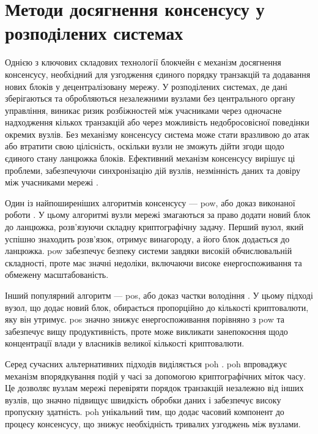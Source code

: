 \documentclass[14pt]{extreport}
\begin{document}
  \section{Методи досягнення консенсусу у розподілених системах}

  Однією з ключових складових технології блокчейн є механізм досягнення консенсусу, необхідний для узгодження єдиного порядку транзакцій та додавання нових блоків у децентралізовану мережу. У розподілених системах, де дані зберігаються та обробляються незалежними вузлами без центрального органу управління, виникає ризик розбіжностей між учасниками через одночасне надходження кількох транзакцій або через можливість недобросовісної поведінки окремих вузлів. Без механізму консенсусу система може стати вразливою до атак або втратити свою цілісність, оскільки вузли не зможуть дійти згоди щодо єдиного стану ланцюжка блоків. Ефективний механізм консенсусу вирішує ці проблеми, забезпечуючи синхронізацію дій вузлів, незмінність даних та довіру між учасниками мережі \cite{consensus}.

  Один із найпоширеніших алгоритмів консенсусу — \gls{pow}, або доказ виконаної роботи \cite{pow}. У цьому алгоритмі вузли мережі змагаються за право додати новий блок до ланцюжка, розв'язуючи складну криптографічну задачу. Перший вузол, який успішно знаходить розв'язок, отримує винагороду, а його блок додається до ланцюжка. \gls{pow} забезпечує безпеку системи завдяки високій обчислювальній складності, проте має значні недоліки, включаючи високе енергоспоживання та обмежену масштабованість.

  Інший популярний алгоритм — \gls{pos}, або доказ частки володіння \cite{pos}. У цьому підході вузол, що додає новий блок, обирається пропорційно до кількості криптовалюти, яку він утримує. \gls{pos} значно знижує енергоспоживання порівняно з \gls{pow} та забезпечує вищу продуктивність, проте може викликати занепокоєння щодо концентрації влади у власників великої кількості криптовалюти.

  Серед сучасних альтернативних підходів виділяється \gls{poh} \cite{poh}. \gls{poh} впроваджує механізм впорядкування подій у часі за допомогою криптографічних міток часу. Це дозволяє вузлам мережі перевіряти порядок транзакцій незалежно від інших вузлів, що значно підвищує швидкість обробки даних і забезпечує високу пропускну здатність. \cite{poh2} \gls{poh} унікальний тим, що додає часовий компонент до процесу консенсусу, що знижує необхідність тривалих узгоджень між вузлами.
\end{document}
